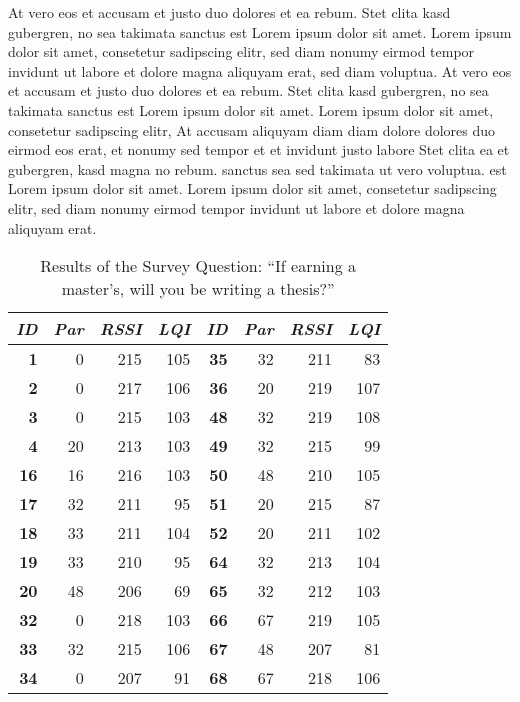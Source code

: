 At vero eos et accusam et justo duo dolores et ea rebum. Stet clita kasd
gubergren, no sea takimata sanctus est Lorem ipsum dolor sit amet. Lorem ipsum
dolor sit amet, consetetur sadipscing elitr,  sed diam nonumy eirmod tempor
invidunt ut labore et dolore magna aliquyam erat, sed diam voluptua. At vero
eos et accusam et justo duo dolores et ea rebum. Stet clita kasd gubergren, no
sea takimata sanctus est Lorem ipsum dolor sit amet. Lorem ipsum dolor sit
amet, consetetur sadipscing elitr,  At accusam aliquyam diam diam dolore
dolores duo eirmod eos erat, et nonumy sed tempor et et invidunt justo labore
Stet clita ea et gubergren, kasd magna no rebum. sanctus sea sed takimata ut
vero voluptua. est Lorem ipsum dolor sit amet. Lorem ipsum dolor sit amet,
consetetur sadipscing elitr,  sed diam nonumy eirmod tempor invidunt ut labore
et dolore magna aliquyam erat. 

\begin{table}
\begin{center}
\begin{tabular}{|r|r|r|r||r|r|r|r|}
\hline \textbf{\textit{ID}} & \textbf{\textit{Par}} & \textbf{\textit{RSSI}} &
\textbf{\textit{LQI}} &
\textbf{\textit{ID}} & \textbf{\textit{Par}} & \textbf{\textit{RSSI}} & \textbf{\textit{LQI}} \\
\hline \hline
\textbf{1}  &  0 & 215 & 105 & \textbf{35} & 32 & 211 &  83 \\
\textbf{2}  &  0 & 217 & 106 & \textbf{36} & 20 & 219 & 107 \\
\textbf{3}  &  0 & 215 & 103 & \textbf{48} & 32 & 219 & 108 \\
\textbf{4}  & 20 & 213 & 103 & \textbf{49} & 32 & 215 &  99 \\
\textbf{16} & 16 & 216 & 103 & \textbf{50} & 48 & 210 & 105 \\
\textbf{17} & 32 & 211 &  95 & \textbf{51} & 20 & 215 &  87 \\
\textbf{18} & 33 & 211 & 104 & \textbf{52} & 20 & 211 & 102 \\
\textbf{19} & 33 & 210 &  95 & \textbf{64} & 32 & 213 & 104 \\
\textbf{20} & 48 & 206 &  69 & \textbf{65} & 32 & 212 & 103 \\
\textbf{32} &  0 & 218 & 103 & \textbf{66} & 67 & 219 & 105 \\
\textbf{33} & 32 & 215 & 106 & \textbf{67} & 48 & 207 &  81 \\
\textbf{34} &  0 & 207 &  91 & \textbf{68} & 67 & 218 & 106 \\
\hline
\end{tabular}
\caption[Results of the Survey Question: ``If earning a master's, will you be \newline writing a thesis?'']{Results of the Survey Question: ``If earning a master's, will you be writing a thesis?''}
\end{center}
\end{table}

